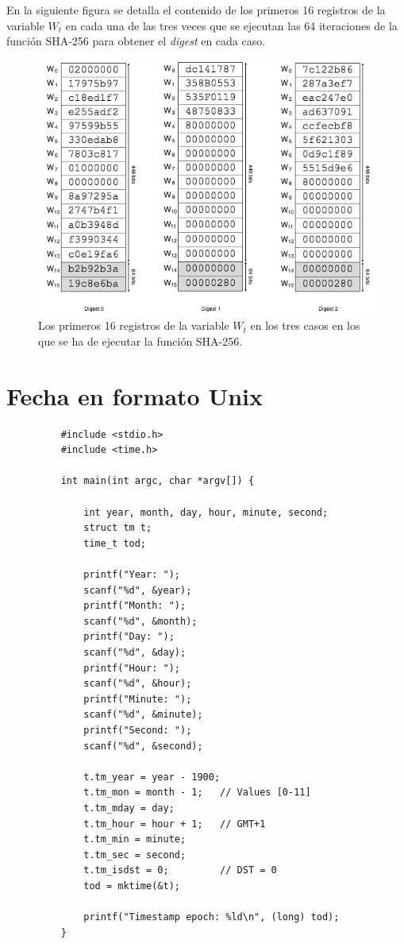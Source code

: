 \documentclass{article}
\begin{document}
    \vspace{3mm}
    En la siguiente figura se detalla el contenido de los primeros 16 registros de la variable $W_{t}$ en cada una de las tres veces que se ejecutan las 64 iteraciones de la función SHA-256 para obtener el \textit{digest} en cada caso.
    \begin{figure}[H]
    \centering
        \includegraphics[scale=0.59]{img/Bitcoin_block_SHA_256_W0_W15_x3}
        \caption{Los primeros 16 registros de la variable $W_{t}$ en los tres casos en los que se ha de ejecutar la función SHA-256.}
    \end{figure}
    
\section{Fecha en formato Unix}
    \begin{figure}[H]
    \centering
        \begin{verbatim}
    #include <stdio.h>
    #include <time.h>
    
    int main(int argc, char *argv[]) {
    
    	int year, month, day, hour, minute, second;
    	struct tm t;
    	time_t tod;
    
    	printf("Year: ");
    	scanf("%d", &year);
    	printf("Month: ");
    	scanf("%d", &month);
    	printf("Day: ");
    	scanf("%d", &day);
    	printf("Hour: ");
    	scanf("%d", &hour);
    	printf("Minute: ");
    	scanf("%d", &minute);
    	printf("Second: ");
    	scanf("%d", &second);
    
    	t.tm_year = year - 1900;
    	t.tm_mon = month - 1;   // Values [0-11]
    	t.tm_mday = day;
    	t.tm_hour = hour + 1;   // GMT+1
    	t.tm_min = minute;
    	t.tm_sec = second;
    	t.tm_isdst = 0;         // DST = 0
    	tod = mktime(&t);
    
    	printf("Timestamp epoch: %ld\n", (long) tod);
    }
        \end{verbatim}
    \end{figure}
\end{document}
